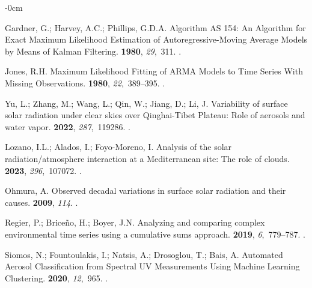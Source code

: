\documentclass[applsci,article,accept,moreauthors,pdftex]{Definitions/mdpi}
\begin{document}
\begin{adjustwidth}{-\extralength}{0cm}
\begin{thebibliography}{999}
Gardner, G.; Harvey, A.C.; Phillips, G.D.A.
\newblock Algorithm {AS} 154: An Algorithm for Exact Maximum Likelihood
  Estimation of Autoregressive-Moving Average Models by Means of Kalman
  Filtering.
 {\bf 1980}, {\em 29},~311.
.

Jones, R.H.
\newblock Maximum Likelihood Fitting of {ARMA} Models to Time Series With
  Missing Observations.
 {\bf 1980}, {\em 22},~389--395.
.

Yu, L.; Zhang, M.; Wang, L.; Qin, W.; Jiang, D.; Li, J.
\newblock Variability of surface solar radiation under clear skies over
  Qinghai-Tibet Plateau: Role of aerosols and water vapor.
 {\bf 2022}, {\em 287},~119286.
.

Lozano, I.L.; Alados, I.; Foyo-Moreno, I.
\newblock Analysis of the solar radiation/atmosphere interaction at a
  Mediterranean site: The role of clouds.
 {\bf 2023}, {\em 296},~107072.
.

Ohmura, A.
\newblock Observed decadal variations in surface solar radiation and their
  causes.
 {\bf 2009}, {\em 114}.
.

Regier, P.; Brice{\~{n}}o, H.; Boyer, J.N.
\newblock Analyzing and comparing complex environmental time series using a
  cumulative sums approach.
 {\bf 2019}, {\em 6},~779--787.
.

Siomos, N.; Fountoulakis, I.; Natsis, A.; Drosoglou, T.; Bais, A.
\newblock Automated Aerosol Classification from Spectral {UV} Measurements
  Using Machine Learning Clustering.
 {\bf 2020}, {\em 12},~965.
.


\end{thebibliography}
\end{adjustwidth}
\end{document}
